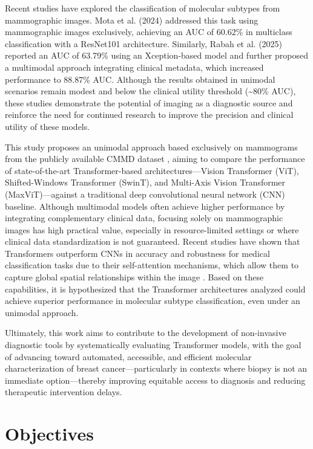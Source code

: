 \documentclass[a4paper,10pt]{book}
\begin{document}
Recent studies have explored the classification of molecular subtypes from mammographic images. Mota et al. (2024) \cite{mota_breast_2024} addressed this task using mammographic images exclusively, achieving an AUC of 60.62\% in multiclass classification with a ResNet101 architecture. Similarly, Rabah et al. (2025) \cite{ben_rabah_multimodal_2025} reported an AUC of 63.79\% using an Xception-based model and further proposed a multimodal approach integrating clinical metadata, which increased performance to 88.87\% AUC. Although the results obtained in unimodal scenarios remain modest and below the clinical utility threshold (\textasciitilde80\% AUC), these studies demonstrate the potential of imaging as a diagnostic source and reinforce the need for continued research to improve the precision and clinical utility of these models.

This study proposes an unimodal approach based exclusively on mammograms from the publicly available CMMD dataset \cite{cai_online_2023}, aiming to compare the performance of state-of-the-art Transformer-based architectures—Vision Transformer (ViT), Shifted-Windows Transformer (SwinT), and Multi-Axis Vision Transformer (MaxViT)—against a traditional deep convolutional neural network (CNN) baseline. Although multimodal models often achieve higher performance by integrating complementary clinical data, focusing solely on mammographic images has high practical value, especially in resource-limited settings or where clinical data standardization is not guaranteed. Recent studies have shown that Transformers outperform CNNs in accuracy and robustness for medical classification tasks due to their self-attention mechanisms, which allow them to capture global spatial relationships within the image \cite{mauricio_comparing_2023}. Based on these capabilities, it is hypothesized that the Transformer architectures analyzed could achieve superior performance in molecular subtype classification, even under an unimodal approach.

Ultimately, this work aims to contribute to the development of non-invasive diagnostic tools by systematically evaluating Transformer models, with the goal of advancing toward automated, accessible, and efficient molecular characterization of breast cancer—particularly in contexts where biopsy is not an immediate option—thereby improving equitable access to diagnosis and reducing therapeutic intervention delays.

\section{Objectives}
\end{document}
